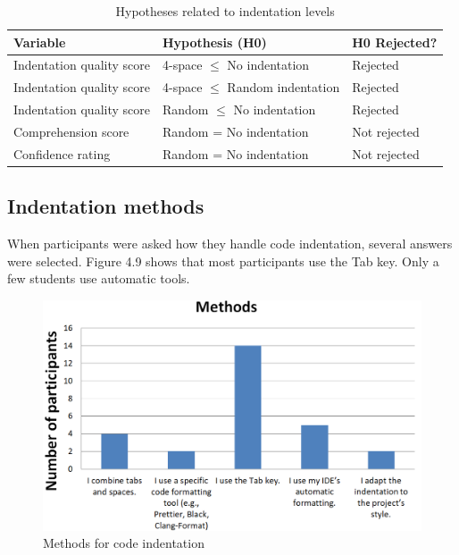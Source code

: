 \begin{table}[ht]
\centering
\small
\begin{tabular}{|p{5cm}|p{6cm}|p{2.5cm}|}
\hline
\rule{0pt}{1.2em}\textbf{Variable} & \textbf{Hypothesis (H0)} & \textbf{H0 Rejected?} \\[0.5em]
\hline
\rule{0pt}{1.2em}Indentation quality score & 4-space $\leq$ No indentation & Rejected \\[0.5em]
\hline
\rule{0pt}{1.2em}Indentation quality score & 4-space $\leq$ Random indentation & Rejected \\[0.5em]
\hline
\rule{0pt}{1.2em}Indentation quality score & Random $\leq$ No indentation & Rejected \\[0.5em]
\hline
\rule{0pt}{1.2em}Comprehension score & Random = No indentation & Not rejected \\[0.5em]
\hline
\rule{0pt}{1.2em}Confidence rating & Random = No indentation & Not rejected \\[0.5em]
\hline
\end{tabular}
\caption{Hypotheses related to indentation levels}
\end{table}


\subsection{Indentation methods}
When participants were asked how they handle code indentation, several answers were selected. Figure 4.9 shows that most participants use the Tab key. Only a few students use automatic tools.  

\begin{figure} [H]
  \centering
  \includegraphics[scale=0.8]{figures/inM.png}
  \caption{Methods for code indentation}
  \label{fig:AnhangsChor}
\end{figure}



